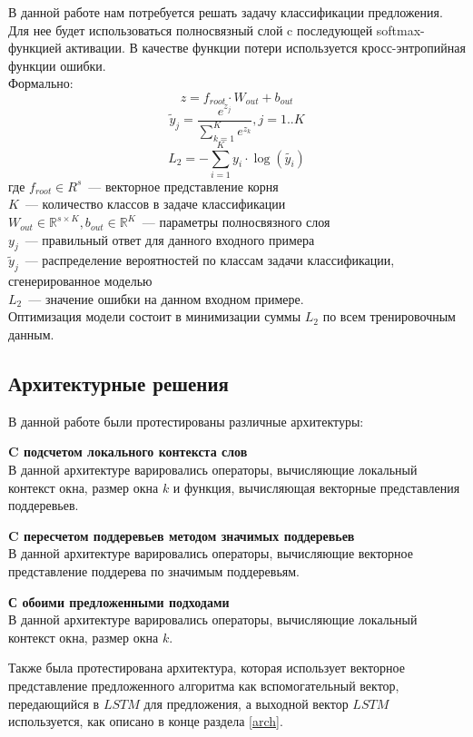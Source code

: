 В данной работе нам потребуется решать задачу классификации предложения.
Для нее будет использоваться полносвязный слой c последующей softmax-функцией активации. 
В качестве функции потери используется кросс-энтропийная функции ошибки.\\
Формально:
$$z=f_{root} \cdot W_{out} + b_{out}$$
$$\tilde{y}_j=\frac{e^{z_j}} {\sum_{k=1}^K e^{z_k}}, j=1..K$$
$$L_2 = -\sum_{i=1}^K y_i \cdot \log(\tilde{y_i})$$
где $f_{root} \in R^s$~--- векторное представление корня\\
$K$~--- количество классов в задаче классификации\\
$W_{out} \in \mathbb{R}^{s \times K}, b_{out} \in \mathbb{R}^K$~--- параметры полносвязного слоя\\
$y_j$~--- правильный ответ для данного входного примера\\
$\tilde{y}_j$~--- распределение вероятностей по классам задачи классификации, сгенерированное моделью\\
$L_2$~--- значение ошибки на данном входном примере.\\
Оптимизация модели состоит в минимизации суммы $L_2$ по всем тренировочным данным.

\subsection{Архитектурные решения}
В данной работе были протестированы различные архитектуры:

\textbf{C подсчетом локального контекста слов}\\
В данной архитектуре варировались операторы, вычисляющие локальный контекст окна, размер окна $k$ и функция, вычисляющая векторные представления поддеревьев.

\textbf{C пересчетом поддеревьев методом значимых поддеревьев}\\
В данной архитектуре варировались операторы, вычисляющие векторное представление поддерева по значимым поддеревьям.

\textbf{С обоими предложенными подходами}\\
В данной архитектуре варировались операторы, вычисляющие локальный контекст окна, размер окна $k$.

\vspace{5mm}
Также была протестирована архитектура, которая использует векторное представление предложенного алгоритма как вспомогательный вектор, передающийся в $LSTM$ для предложения, а выходной вектор $LSTM$ используется, как описано в конце раздела \ref{arch}.